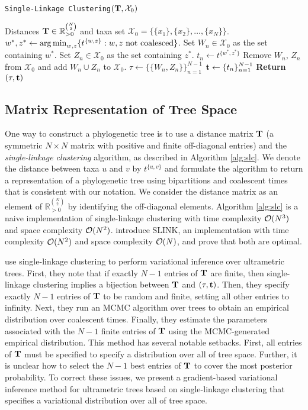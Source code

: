 \begin{algorithm}[ht]
\caption{{\tt Single-Linkage Clustering}$(\mathbf{T},\mathcal{X}_0)$}\label{alg:slc}
\begin{algorithmic}[1]
 Distances $\mathbf{T} \in \mathbb{R}_{>0}^{\binom{N}{2}}$ and taxa set $\mathcal{X}_0 = \{\{x_1\},\{x_2\},\ldots,\{x_N\}\}$.
%
\vspace{1mm}
%
%
\STATE $w^*,z^* \leftarrow \operatorname*{arg\,min}_{w,z} \{t^{\{w,z\}}: w, z \text{ not coalesced}\}$.
%
\STATE Set $W_n \in \mathcal{X}_0$ as the set containing $w^*$.
%
\STATE Set $Z_n \in \mathcal{X}_0$ as the set containing $z^*$. 
%
\STATE $t_n \leftarrow t^{\{w^*,z^*\}}$
%
\STATE Remove $W_n$, $Z_n$ from $\mathcal{X}_0$ and add $W_n \cup Z_n$ to $\mathcal{X}_0$.
\ENDFOR
\STATE $\tau \leftarrow \{\{W_n,Z_n\}\}_{n=1}^{N-1}$
\STATE $\mathbf{t} \leftarrow \{t_n\}_{n=1}^{N-1}$
\STATE \textbf{Return } $(\tau,\mathbf{t})$
\end{algorithmic}
\end{algorithm}

\subsection{Matrix Representation of Tree Space}

One way to construct a phylogenetic tree is to use a distance matrix $\mathbf{T}$ (a symmetric $N \times N$ matrix with positive and finite off-diagonal entries) and the \textit{single-linkage clustering} algorithm, as described in Algorithm \ref{alg:slc}. We denote the distance between taxa $u$ and $v$ by $t^{\{u,v\}}$ and formulate the algorithm to return a representation of a phylogenetic tree using bipartitions and coalescent times that is consistent with our notation. We consider the distance matrix as an element of $\mathbb{R}^{\binom{N}{2}}_{>0}$ by identifying the off-diagonal elements. 
%
Algorithm \ref{alg:slc} is a naive implementation of single-linkage clustering with time complexity $\mathcal{O}(N^3)$ and space complexity $\mathcal{O}(N^2)$. \citet{Sibson:1973} introduce SLINK, an implementation with time complexity $\mathcal{O}(N^2)$ and space complexity $\mathcal{O}(N)$, and prove that both are optimal. 

\citet{Bouckaert:2024} use single-linkage clustering to perform variational inference over ultrametric trees. First, they note that if exactly $N-1$ entries of $\mathbf{T}$ are finite, then single-linkage clustering implies a bijection between $\mathbf{T}$ and $(\tau,\mathbf{t})$. Then, they specify exactly $N-1$ entries of $\mathbf{T}$ to be random and finite, setting all other entries to infinity. Next, they run an MCMC algorithm over trees to obtain an empirical distribution over coalescent times. Finally, they estimate the parameters associated with the $N-1$ finite entries of $\mathbf{T}$ using the MCMC-generated empirical distribution. This method has several notable setbacks. First, all entries of $\mathbf{T}$ must be specified to specify a distribution over all of tree space. Further, it is unclear how to select the $N-1$ best entries of $\mathbf{T}$ to cover the most posterior probability. To correct these issues, we present a gradient-based variational inference method for ultrametric trees based on single-linkage clustering that specifies a variational distribution over all of tree space.


